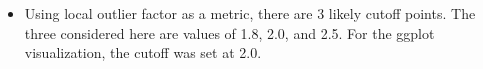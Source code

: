 \documentclass[11pt]{article}
\begin{document}
\begin{enumerate}
\begin{itemize}
\begin{figure}[H]
\begin{center}
{\begin{centering}
\par\end{centering}}
\quad{}
\end{center}
\end{figure}


\item Using local outlier factor as a metric, there are 3 likely cutoff points. 
The three considered here are values of 1.8, 2.0, and 2.5. 
For the ggplot visualization, the cutoff was set at 2.0.



\end{itemize}
\end{enumerate}
\end{document}
